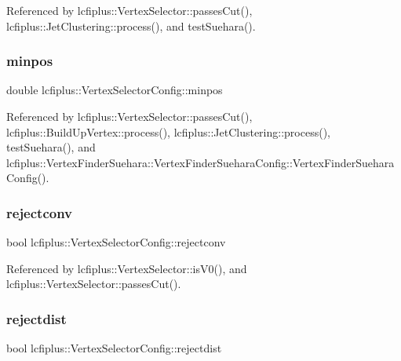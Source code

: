 Referenced by lcfiplus\+::\+Vertex\+Selector\+::passes\+Cut(), lcfiplus\+::\+Jet\+Clustering\+::process(), and test\+Suehara().

\mbox{\label{classlcfiplus_1_1VertexSelectorConfig_a28286c647c6fd07d61b92f8701a3a656}} 
\subsubsection{minpos}
{\footnotesize\ttfamily double lcfiplus\+::\+Vertex\+Selector\+Config\+::minpos}



Referenced by lcfiplus\+::\+Vertex\+Selector\+::passes\+Cut(), lcfiplus\+::\+Build\+Up\+Vertex\+::process(), lcfiplus\+::\+Jet\+Clustering\+::process(), test\+Suehara(), and lcfiplus\+::\+Vertex\+Finder\+Suehara\+::\+Vertex\+Finder\+Suehara\+Config\+::\+Vertex\+Finder\+Suehara\+Config().

\mbox{\label{classlcfiplus_1_1VertexSelectorConfig_ab828bc9e58cfef3a9aecc031c79ef67b}} 
\subsubsection{rejectconv}
{\footnotesize\ttfamily bool lcfiplus\+::\+Vertex\+Selector\+Config\+::rejectconv}



Referenced by lcfiplus\+::\+Vertex\+Selector\+::is\+V0(), and lcfiplus\+::\+Vertex\+Selector\+::passes\+Cut().

\mbox{\label{classlcfiplus_1_1VertexSelectorConfig_a7aba5b2a0aaf1be09634dc0334bf265b}} 
\subsubsection{rejectdist}
{\footnotesize\ttfamily bool lcfiplus\+::\+Vertex\+Selector\+Config\+::rejectdist}



